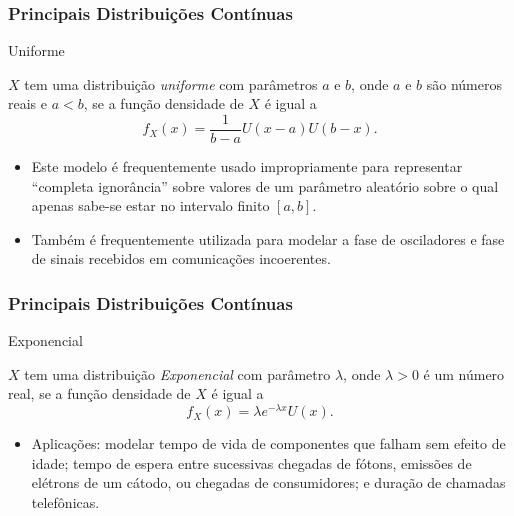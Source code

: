 %
\begin{frame}
\frametitle{\textbf{Principais Distribuições Contínuas}}
\baselineskip=13pt
\begin{block}{Uniforme}

$X$ tem uma distribuição {\em
uniforme} com parâmetros $a$ e $b$, onde $a$ e $b$ são números reais
e $a<b$, se a função densidade de $X$ é igual a
%
$$f_X(x)=\frac{1}{b-a}U(x-a)U(b-x).$$

\begin{itemize}
\item Este modelo é frequentemente usado impropriamente para representar
``completa ignorância'' sobre valores de um parâmetro aleatório
sobre  o qual apenas sabe-se estar no intervalo finito $[a,b]$.
\item Também é frequentemente utilizada para modelar a fase de osciladores
e fase de sinais recebidos em comunicações incoerentes.
\end{itemize}

\end{block}
\end{frame}
%
\begin{frame}
\frametitle{\textbf{Principais Distribuições Contínuas}}
\baselineskip=13pt
\begin{block}{Exponencial}

$X$ tem uma distribuição {\em
Exponencial} com parâmetro $\lambda$, onde $\lambda>0$ é um número
real, se a função densidade de $X$ é igual a
%
$$f_X(x)=\lambda e^{-\lambda x}U(x).$$

\begin{itemize}
\item Aplicações: modelar tempo de vida de componentes que falham sem efeito de
idade; tempo de espera entre sucessivas chegadas de fótons, emissões
de elétrons de um cátodo, ou chegadas de consumidores; e duração de
chamadas telefônicas.
\end{itemize}

\end{block}
\end{frame}

